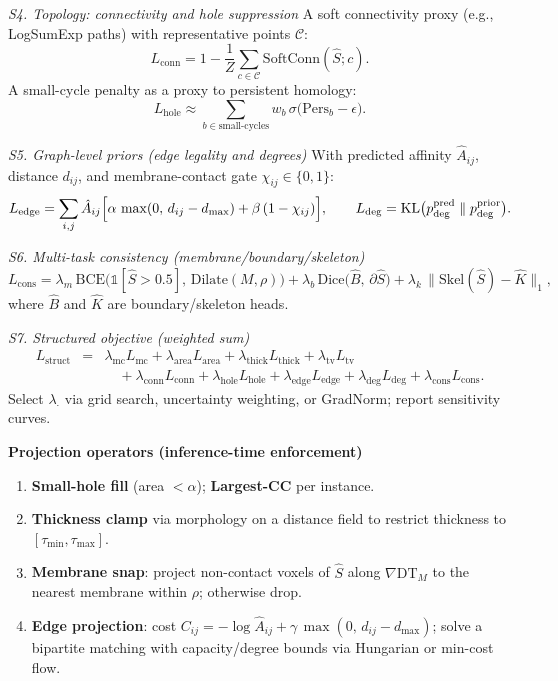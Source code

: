 \noindent\textit{S4. Topology: connectivity and hole suppression}\;
A soft connectivity proxy (e.g., LogSumExp paths) with representative points \(\mathcal C\):
\[
L_{\mathrm{conn}}=1-\frac{1}{Z}\sum_{c\in\mathcal C}\mathrm{SoftConn}(\hat S;c).
\]
A small-cycle penalty as a proxy to persistent homology:
\[
L_{\mathrm{hole}}\approx \sum_{b\in \text{small-cycles}} w_b\,\sigma\!\bigl(\mathrm{Pers}_b-\epsilon\bigr).
\]

\noindent\textit{S5. Graph-level priors (edge legality and degrees)}\;
With predicted affinity \(\hat A_{ij}\), distance \(d_{ij}\), and membrane-contact gate \(\chi_{ij}\in\{0,1\}\):
\[
L_{\mathrm{edge}}
=\sum_{i,j}\hat A_{ij}\Bigl[\alpha\,\max(0,\,d_{ij}-d_{\max})+\beta\,(1-\chi_{ij})\Bigr],
\qquad
L_{\mathrm{deg}}=\mathrm{KL}\bigl(p_{\mathrm{deg}}^{\mathrm{pred}}\;\|\;p_{\mathrm{deg}}^{\mathrm{prior}}\bigr).
\]

\noindent\textit{S6. Multi-task consistency (membrane/boundary/skeleton)}\;
\[
L_{\mathrm{cons}}
=\lambda_m\,\mathrm{BCE}\!\bigl(\mathbb{1}[\hat S>0.5],\,\mathrm{Dilate}(M,\rho)\bigr)
+\lambda_b\,\mathrm{Dice}\bigl(\hat B,\,\partial \hat S\bigr)
+\lambda_k\,\lVert \mathrm{Skel}(\hat S)-\hat K\rVert_1,
\]
where \(\hat B\) and \(\hat K\) are boundary/skeleton heads.

\noindent\textit{S7. Structured objective (weighted sum)}\;
\begin{eqnarray}
L_{\text{struct}} &=& \lambda_{\mathrm{mc}}L_{\mathrm{mc}}+\lambda_{\mathrm{area}}L_{\mathrm{area}}
+\lambda_{\mathrm{thick}}L_{\mathrm{thick}}+\lambda_{\mathrm{tv}}L_{\mathrm{tv}} \nonumber \\
&&\quad + \lambda_{\mathrm{conn}}L_{\mathrm{conn}}+\lambda_{\mathrm{hole}}L_{\mathrm{hole}}
+\lambda_{\mathrm{edge}}L_{\mathrm{edge}}+\lambda_{\mathrm{deg}}L_{\mathrm{deg}}
+\lambda_{\mathrm{cons}}L_{\mathrm{cons}}.
\end{eqnarray}
Select \(\lambda_{\cdot}\) via grid search, uncertainty weighting, or GradNorm; report sensitivity curves.\par

\medskip
\noindent\textbf{Projection operators (inference-time enforcement)}\;
\begin{enumerate}
  \item \textbf{Small-hole fill} (area \(<\alpha\)); \textbf{Largest-CC} per instance.
  \item \textbf{Thickness clamp} via morphology on a distance field to restrict thickness to \([\tau_{\min},\tau_{\max}]\).
  \item \textbf{Membrane snap}: project non-contact voxels of \(\hat S\) along \(\nabla \mathrm{DT}_M\) to the nearest membrane within \(\rho\); otherwise drop.
  \item \textbf{Edge projection}: cost \(C_{ij}=-\log \hat A_{ij}+\gamma\,\max(0,\,d_{ij}-d_{\max})\); solve a bipartite matching with capacity/degree bounds via Hungarian or min-cost flow.
\end{enumerate}


